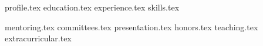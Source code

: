\documentclass[11pt, a4paper]{awesome-cv}
\newcommand*{\sectiondir}{cv-sections/}
\begin{document}
\makecvheader %

{profile.tex}
{education.tex}
{experience.tex}
{skills.tex}

{mentoring.tex}
\newpage
{committees.tex}
%
{presentation.tex}
{honors.tex}
\newpage
{teaching.tex}
{extracurricular.tex}

\end{document}
